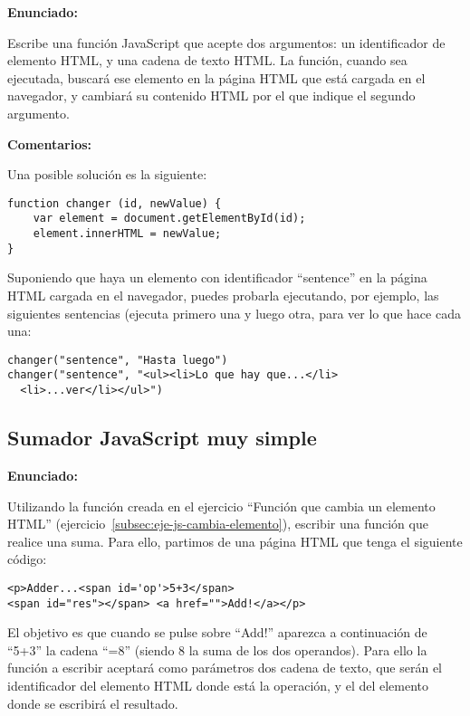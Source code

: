 \textbf{Enunciado:}

Escribe una función JavaScript que acepte dos argumentos: un identificador de elemento HTML, y una cadena de texto HTML. La función, cuando sea ejecutada, buscará ese elemento en la página HTML que está cargada en el navegador, y cambiará su contenido HTML por el que indique el segundo argumento.

\textbf{Comentarios:}

Una posible solución es la siguiente:

\begin{verbatim}
function changer (id, newValue) {
    var element = document.getElementById(id);
    element.innerHTML = newValue;
}
\end{verbatim}

Suponiendo que haya un elemento con identificador ``sentence'' en la página HTML cargada en el navegador, puedes probarla ejecutando, por ejemplo, las siguientes sentencias (ejecuta primero una y luego otra, para ver lo que hace cada una:

\begin{verbatim}
changer("sentence", "Hasta luego")
changer("sentence", "<ul><li>Lo que hay que...</li>
  <li>...ver</li></ul>")
\end{verbatim}

\subsection{Sumador JavaScript muy simple}
\label{subsec:eje-js-sumador-muy-simple}


\textbf{Enunciado:}

Utilizando la función creada en el ejercicio ``Función que cambia un elemento HTML'' (ejercicio~\ref{subsec:eje-js-cambia-elemento}), escribir una función que realice una suma. Para ello, partimos de una página HTML que tenga el siguiente código:

\begin{verbatim}
<p>Adder...<span id='op'>5+3</span>
<span id="res"></span> <a href="">Add!</a></p>
\end{verbatim}

El objetivo es que cuando se pulse sobre ``Add!'' aparezca a continuación de ``5+3'' la cadena ``=8'' (siendo 8 la suma de los dos operandos). Para ello la función a escribir aceptará como parámetros dos cadena de texto, que serán el identificador del elemento HTML donde está la operación, y el del elemento donde se escribirá el resultado.

